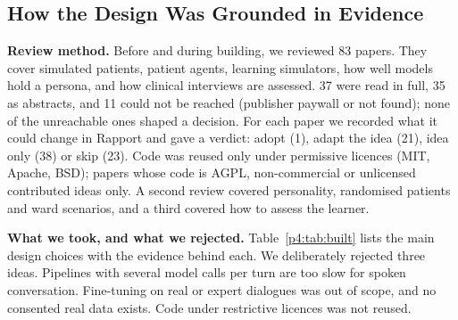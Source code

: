 \documentclass[10pt]{article}
\begin{document}
\subsection{How the Design Was Grounded in Evidence}\label{sec:evidence}
\textbf{Review method.} Before and during building, we reviewed 83 papers. They cover simulated patients, patient agents, learning simulators, how well models hold a persona, and how clinical interviews are assessed. 37 were read in full, 35 as abstracts, and 11 could not be reached (publisher paywall or not
found); none of the unreachable ones shaped a decision. For each paper we recorded what it could change in Rapport and gave a verdict: adopt
(1), adapt the idea (21), idea only (38) or skip (23). Code was reused only under permissive licences (MIT, Apache, BSD); papers whose code is
AGPL, non-commercial or unlicensed contributed ideas only. A second review covered personality, randomised patients and ward scenarios, and a
third covered how to assess the learner.

\textbf{What we took, and what we rejected.} Table~\ref{p4:tab:built} lists the main design choices with the evidence behind each. We deliberately rejected three ideas. Pipelines with several model calls per turn are too slow for spoken conversation. Fine-tuning on real or expert dialogues was out of scope, and no consented real data exists. Code under restrictive licences was not reused.
\end{document}
